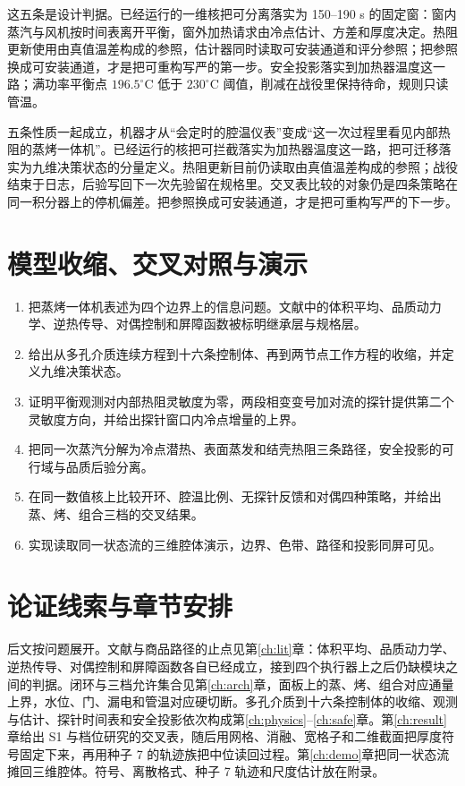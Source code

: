这五条是设计判据。已经运行的一维核把可分离落实为 150--190 s 的固定窗：窗内蒸汽与风机按时间表离开平衡，窗外加热请求由冷点估计、方差和厚度决定。热阻更新使用由真值温差构成的参照，估计器同时读取可安装通道和评分参照；把参照换成可安装通道，才是把可重构写严的第一步。安全投影落实到加热器温度这一路；满功率平衡点 \(196.5^\circ\mathrm{C}\) 低于 \(230^\circ\mathrm{C}\) 阈值，削减在战役里保持待命，规则只读管温。

五条性质一起成立，机器才从“会定时的腔温仪表”变成“这一次过程里看见内部热阻的蒸烤一体机”。已经运行的核把可拦截落实为加热器温度这一路，把可迁移落实为九维决策状态的分量定义。热阻更新目前仍读取由真值温差构成的参照；战役结束于日志，后验写回下一次先验留在规格里。交叉表比较的对象仍是四条策略在同一积分器上的停机偏差。把参照换成可安装通道，才是把可重构写严的下一步。

\section{模型收缩、交叉对照与演示}

\begin{enumerate}
\item 把蒸烤一体机表述为四个边界上的信息问题。文献中的体积平均、品质动力学、逆热传导、对偶控制和屏障函数被标明继承层与规格层。
\item 给出从多孔介质连续方程到十六条控制体、再到两节点工作方程的收缩，并定义九维决策状态。
\item 证明平衡观测对内部热阻灵敏度为零，两段相变变号加对流的探针提供第二个灵敏度方向，并给出探针窗口内冷点增量的上界。
\item 把同一次蒸汽分解为冷点潜热、表面蒸发和结壳热阻三条路径，安全投影的可行域与品质后验分离。
\item 在同一数值核上比较开环、腔温比例、无探针反馈和对偶四种策略，并给出蒸、烤、组合三档的交叉结果。
\item 实现读取同一状态流的三维腔体演示，边界、色带、路径和投影同屏可见。
\end{enumerate}

\section{论证线索与章节安排}

后文按问题展开。文献与商品路径的止点见第\ref{ch:lit}章：体积平均、品质动力学、逆热传导、对偶控制和屏障函数各自已经成立，接到四个执行器上之后仍缺模块之间的判据。闭环与三档允许集合见第\ref{ch:arch}章，面板上的蒸、烤、组合对应通量上界，水位、门、漏电和管温对应硬切断。多孔介质到十六条控制体的收缩、观测与估计、探针时间表和安全投影依次构成第\ref{ch:physics}--\ref{ch:safe}章。第\ref{ch:result}章给出 S1 与档位研究的交叉表，随后用网格、消融、宽格子和二维截面把厚度符号固定下来，再用种子 7 的轨迹族把中位读回过程。第\ref{ch:demo}章把同一状态流摊回三维腔体。符号、离散格式、种子 7 轨迹和尺度估计放在附录。

